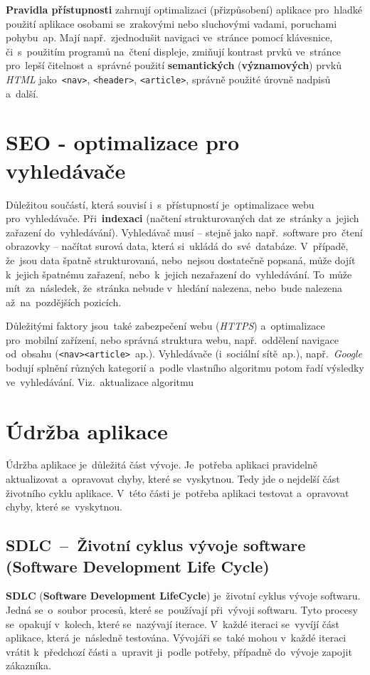 \documentclass[11pt,a4paper]{report}
\begin{document}
                \textbf{Pravidla přístupnosti} zahrnují optimalizaci (přizpůsobení) aplikace pro~hladké použití aplikace osobami se~zrakovými nebo sluchovými vadami, poruchami pohybu~ap. Mají např.~zjednodušit navigaci ve~stránce pomocí klávesnice, či~s~použitím programů na~čtení displeje, zmiňují kontrast prvků ve~stránce pro~lepší čitelnost a~správné použití \textbf{semantických} (\textbf{významových}) prvků \emph{HTML} jako~\texttt{<nav>}, \texttt{<header>}, \texttt{<article>}, správně použité úrovně nadpisů a~další. \cite{w3WCAGOverview}

        \section{SEO - optimalizace pro vyhledávače}
                Důležitou součástí, která souvisí i~s~přístupností je~optimalizace webu pro~vyhledávače. Při~\textbf{indexaci} (načtení strukturovaných dat ze~stránky a~jejich zařazení do~vyhledávání). Vyhledávač musí -- stejně jako např.~software pro~čtení obrazovky -- načítat surová data, která si~ukládá do~své~databáze. V~případě, že~jsou data špatně strukturovaná, nebo~nejsou dostatečně popsaná, může dojít k~jejich špatnému zařazení, nebo~k~jejich nezařazení do~vyhledávání. To~může mít~za~následek, že~stránka nebude v~hledání nalezena, nebo~bude nalezena až~na~pozdějších pozicích. \cite{dover2012seo}

                Důležitými faktory jsou~také zabezpečení webu (\emph{HTTPS}) a~optimalizace pro~mobilní zařízení, nebo správná struktura webu, např.~oddělení navigace od~obsahu (\texttt{<nav><article>}~ap.). Vyhledávače (i~sociální sítě~ap.), např.~\emph{Google} bodují splnění různých kategorií a~podle vlastního algoritmu potom řadí výsledky ve~vyhledávání. Viz.~aktualizace algoritmu~\cite{hladis2016aktualizace}

        \section{Údržba aplikace}
            Údržba aplikace je~důležitá část vývoje. Je~potřeba aplikaci pravidelně aktualizovat a~opravovat chyby, které se~vyskytnou.
            Tedy jde o nejdelší část životního cyklu aplikace. V~této části je~potřeba aplikaci testovat a~opravovat chyby, které se~vyskytnou.
            
            \subsection{SDLC~--~Životní cyklus vývoje software (Software Development Life Cycle)}
                \textbf{SDLC} (\textbf{Software Development LifeCycle}) je~životní cyklus vývoje softwaru. Jedná se~o~soubor procesů, které se~používají při~vývoji softwaru. Tyto procesy se~opakují v~kolech, které se~nazývají iterace. V~každé iteraci se~vyvíjí část aplikace, která je~následně testována. Vývojáři se~také mohou v~každé iteraci vrátit k~předchozí části a~upravit ji~podle potřeby, případně do~vývoje zapojit zákazníka.
\end{document}
